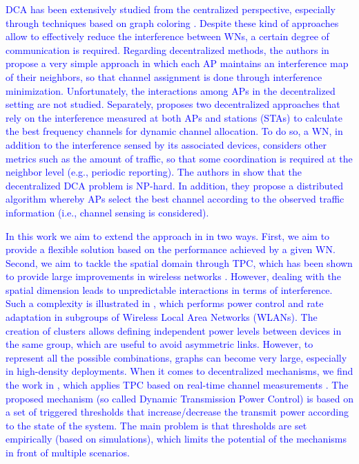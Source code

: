 \documentclass[preprint,12pt]{elsarticle}
\begin{document}
	\textcolor{blue}{DCA has been extensively studied from the centralized perspective, especially through techniques based on graph coloring \cite{riihijarvi2005frequency, mishra2005weighted}. Despite these kind of approaches allow to effectively reduce the interference between WNs, a certain degree of communication is required. Regarding decentralized methods, the authors in \cite{akl2007dynamic} propose a very simple approach in which each AP maintains an interference map of their neighbors, so that channel assignment is done through interference minimization. Unfortunately, the interactions among APs in the decentralized setting are not studied. Separately, \cite{chen2007improved} proposes two decentralized approaches that rely on the interference measured at both APs and stations (STAs) to calculate the best frequency channels for dynamic channel allocation. To do so, a WN, in addition to the interference sensed by its associated devices, considers other metrics such as the amount of traffic, so that some coordination is required at the neighbor level (e.g., periodic reporting). The authors in \cite{yue2011cacao} show that the decentralized DCA problem is NP-hard. In addition, they propose a distributed algorithm whereby APs select the best channel according to the observed traffic information (i.e., channel sensing is considered).}
	
	\textcolor{blue}{In this work we aim to extend the approach in \cite{yue2011cacao} in two ways. \textcolor{blue}{First, we aim to provide a flexible solution based on the performance achieved by a given WN.} Second, we aim to tackle the spatial domain through TPC\textcolor{blue}{, which has been shown to provide large improvements in wireless networks \cite{elbatt2000power}}. \textcolor{blue}{However}, dealing with the spatial dimension leads to unpredictable interactions in terms of interference. \textcolor{blue}{Such a complexity is illustrated} in \cite{tang2014joint}, which performs power control and rate adaptation in subgroups of Wireless Local Area Networks (WLANs). The creation of clusters allows defining independent power levels between devices in the same group, which are useful to avoid asymmetric links. However, to represent all the possible combinations, graphs can become very large, especially in high-density deployments. \textcolor{blue}{When it comes to decentralized mechanisms, we find the work in \cite{gandarillas2014dynamic}, which applies TPC based on real-time channel measurements \cite{gandarillas2014dynamic}}. The proposed mechanism (so called Dynamic Transmission Power Control) is based on a set of triggered thresholds that increase/decrease the transmit power according to the state of the system. The main problem is that thresholds are set empirically (based on simulations), which limits the potential of the mechanisms in front of multiple scenarios.}
	
\end{document}
